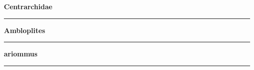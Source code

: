 \documentclass[11pt]{exam}
\newcommand*\Matching[1]{
\ifprintanswers
	\textbf{#1}
\else
	\rule{2.1in}{0.4pt}
\fi
}
\newlength\matchlena
\newlength\matchlenb
\newcommand\MatchQuestion[2]{%
	\setlength\matchlenb{\linewidth}
	\addtolength\matchlenb{-\matchlena}
	\parbox[t]{\matchlena}{\Matching{#1}}\enspace\parbox[t]{\matchlenb}{#2}}
\newlength\eclength
\newcommand*\ECQuestion[2]{%
	\setlength\matchlenb{\linewidth}
	\addtolength\matchlenb{-\eclength}
	\hspace{-0.24in}\textsc{ec}.\enspace\parbox[t]{\eclength}{\Matching{#1}}\enspace\parbox[t]{\matchlenb}{#2}}
\begin{document}
\begin{questions}
\begin{multicols}{2}
	\question\MatchQuestion{Centrarchidae}{}
	\vspace{1.5\baselineskip}
	
	\question\MatchQuestion{Ambloplites}{}
	\vspace{1.5\baselineskip}
	
	\question\MatchQuestion{ariommus}{}
	
	
\end{multicols}

\end{questions}
\end{document}
